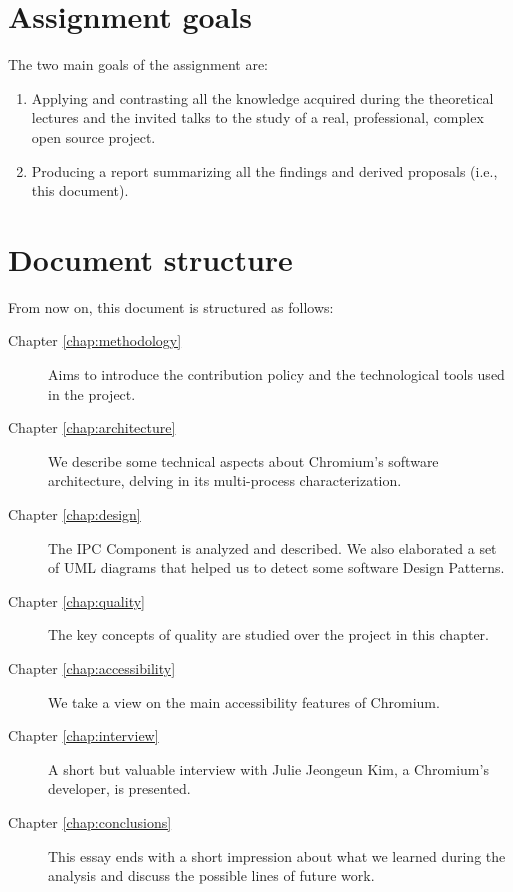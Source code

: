 \section{Assignment goals}
The two main goals of the assignment are:

\begin{enumerate}
    \item Applying and contrasting all the knowledge acquired during the theoretical lectures and the invited talks to the study of a real, professional, complex open source project.
    \item Producing a report summarizing all the findings and derived proposals (i.e., this document).
\end{enumerate}


\section{Document structure}
From now on, this document is structured as follows:
\begin{description}
    \item[Chapter \ref{chap:methodology}] Aims to introduce the contribution policy and the technological tools used in the project.
    \item[Chapter \ref{chap:architecture}] We describe some technical aspects about Chromium's software architecture, delving in its multi-process characterization.
    \item[Chapter \ref{chap:design}] The IPC Component is analyzed and described. We also elaborated a set of UML diagrams that helped us to detect some software Design Patterns.
    \item[Chapter \ref{chap:quality}] The key concepts of quality are studied over the project in this chapter.
    \item[Chapter \ref{chap:accessibility}] We take a view on the main accessibility features of Chromium.
    \item[Chapter \ref{chap:interview}] A short but valuable interview with Julie Jeongeun Kim, a Chromium's developer, is presented.
    \item[Chapter \ref{chap:conclusions}] This essay ends with a short impression about what we learned during the analysis and discuss the possible lines of future work.
\end{description}